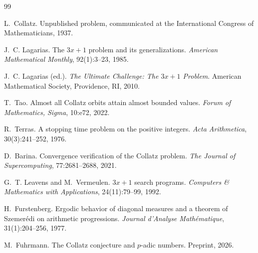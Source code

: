 \documentclass[12pt,a4paper]{article}
\begin{document}
\begin{thebibliography}{99}

L.~Collatz.
\newblock Unpublished problem, communicated at the International Congress of Mathematicians, 1937.

J.~C. Lagarias.
\newblock The $3x+1$ problem and its generalizations.
\newblock \emph{American Mathematical Monthly}, 92(1):3--23, 1985.

J.~C. Lagarias (ed.).
\newblock \emph{The Ultimate Challenge: The $3x+1$ Problem}.
\newblock American Mathematical Society, Providence, RI, 2010.

T.~Tao.
\newblock Almost all Collatz orbits attain almost bounded values.
\newblock \emph{Forum of Mathematics, Sigma}, 10:e72, 2022.

R.~Terras.
\newblock A stopping time problem on the positive integers.
\newblock \emph{Acta Arithmetica}, 30(3):241--252, 1976.

D.~Barina.
\newblock Convergence verification of the Collatz problem.
\newblock \emph{The Journal of Supercomputing}, 77:2681--2688, 2021.

G.~T. Leavens and M.~Vermeulen.
\newblock $3x+1$ search programs.
\newblock \emph{Computers \& Mathematics with Applications}, 24(11):79--99, 1992.

H.~Furstenberg.
\newblock Ergodic behavior of diagonal measures and a theorem of Szemer\'edi on arithmetic progressions.
\newblock \emph{Journal d'Analyse Math\'ematique}, 31(1):204--256, 1977.

M.~Fuhrmann.
\newblock The Collatz conjecture and $p$-adic numbers.
\newblock Preprint, 2026.

\end{thebibliography}
\end{document}

